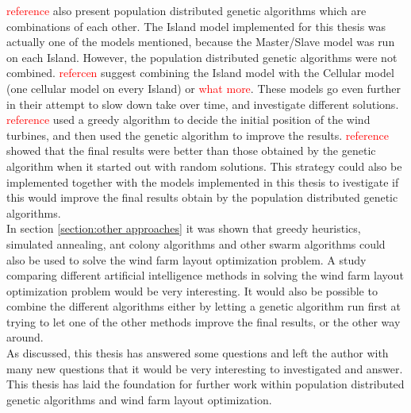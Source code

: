 \noindent \textcolor{red}{reference} also present population distributed genetic algorithms which are combinations of each other. The Island model implemented for this thesis was actually one of the models mentioned, because the Master/Slave model was run on each Island. However, the population distributed genetic algorithms were not combined. \textcolor{red}{refercen} suggest combining the Island model with the Cellular model (one cellular model on every Island) or \textcolor{red}{what more}. These models go even further in their attempt to slow down take over time, and investigate different solutions.\\


\noindent \textcolor{red}{reference} used a greedy algorithm to decide the initial position of the wind turbines, and then used the genetic algorithm to improve the results. \textcolor{red}{reference} showed that the final results were better than those obtained by the genetic algorithm when it started out with random solutions. This strategy could also be implemented together with the models implemented in this thesis to ivestigate if this would improve the final results obtain by the population distributed genetic algorithms. \\


\noindent In section \ref{section:other approaches} it was shown that greedy heuristics, simulated annealing, ant colony algorithms and other swarm algorithms could also be used to solve the wind farm layout optimization problem. A study comparing different artificial intelligence methods in solving the wind farm layout optimization problem would be very interesting. It would also be possible to combine the different algorithms either by letting a genetic algorithm run first at trying to let one of the other methods improve the final results, or the other way around. \\

\noindent As discussed, this thesis has answered some questions and left the author with many new questions that it would be very interesting to investigated and answer. This thesis has laid the foundation for further work within population distributed genetic algorithms and wind farm layout optimization.\\